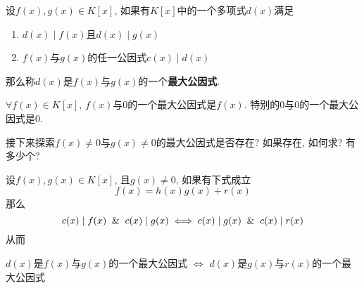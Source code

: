 \begin{Definition}[最大公因式]
设$f(x), g(x) \in K[x]$, 如果有$K[x]$中的一个多项式$d(x)$满足
\begin{enumerate}[(1)]
\item $d(x) \mid f(x)$且$d(x) \mid g(x)$
\item $f(x)$与$g(x)$的任一公因式$c(x) \mid d(x)$
\end{enumerate}
那么称$d(x)$是$f(x)$与$g(x)$的一个\textbf{最大公因式}.
\end{Definition}

\begin{Note}
$\forall f(x) \in K[x]$, $f(x)$与$0$的一个最大公因式是$f(x)$. 特别的$0$与$0$的一个最大公因式是$0$.
\end{Note}

\begin{Note}
接下来探索$f(x) \neq 0$与$g(x) \neq 0$的最大公因式是否存在? 如果存在, 如何求? 有多少个? 
\end{Note}

\begin{Lemma}
设$f(x), g(x) \in K[x]$, 且$g(x) \neq 0$, 如果有下式成立
\[
	f(x) = h(x) g(x) + r(x)
\]
那么
\[
c(x) \mid f(x) \And c(x) \mid g(x) \iff c(x) \mid g(x) \And c(x) \mid r(x)
\]
从而
\begin{center}
$d(x)$是$f(x)$与$g(x)$的一个最大公因式 $\iff$ $d(x)$是$g(x)$与$r(x)$的一个最大公因式
\end{center}
\end{Lemma}

\begin{comment}
\begin{Note}[辗转相除法]
设$f(x), g(x) \in K[x]$, 且$g(x) \neq 0$, 作带余除法
\[
	f(x) = h_1(x) g(x) + r_1(x), \deg r_1(x) < \deg g(x)
\]
若$r_1(x) \neq 0$, 则
\[
	g(x) = h_2(x) r_1(x) + r_2(x), \deg r_2(x) < \deg r_1(x)
\]
若$r_2(x) \neq 0$, 则
\[
	r_1(x) = h_3(x) r_2(x) + r_3(x), \deg r_3(x) < \deg r_2(x)
\]
\[
\vdots \quad \text{有限步必终止, 不妨设$r_{s+1}$是第一个$=0$的多项式} \quad \vdots
\]
若$r_{s-1}(x) \neq 0$, 则
\[
	r_{s-2}(x) = h_s(x) r_{s-1}(x) + r_s(x), \deg r_s(x) < \deg r_{s-1}(x)
\]
若$r_{s}(x) \neq 0$, 则
\[
	r_{s-1}(x) = h_{s+1}(x) r_{s}(x) + 0
\]
于是
\[
\begin{aligned}
& \phantom{\implies} \text{$ r_s(x) $ 是 $r_s(x)$与$0$的一个最大公因式} \\
& \implies           \text{$ r_s(x) $ 是 $r_{s-1}(x)$与$r_s(x)$的一个最大公因式} \\
& \implies           \text{$ r_s(x) $ 是 $r_{s-2}(x)$与$r_{s-1}(x)$的一个最大公因式} \\
& \phantom{\implies} \vdots \\
& \implies           \text{$ r_s(x) $ 是 $r_{1}(x)$与$r_{2}(x)$的一个最大公因式} \\
& \implies           \text{$ r_s(x) $ 是 $g(x)$与$r_{1}(x)$的一个最大公因式} \\
& \implies           \text{$ r_s(x) $ 是 $f(x)$与$g(x)$的一个最大公因式} \\
\end{aligned}
\]
\end{Note}
\end{comment}

